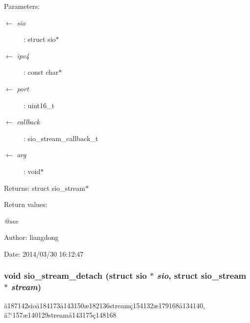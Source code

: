 \begin{Desc}
\item[Parameters:]
\begin{description}
\item[\mbox{$\leftarrow$} {\em sio}]: struct sio$\ast$ \item[\mbox{$\leftarrow$} {\em ipv4}]: const char$\ast$ \item[\mbox{$\leftarrow$} {\em port}]: uint16\_\-t \item[\mbox{$\leftarrow$} {\em callback}]: sio\_\-stream\_\-callback\_\-t \item[\mbox{$\leftarrow$} {\em arg}]: void$\ast$ \end{description}
\end{Desc}
\begin{Desc}
\item[Returns:]struct sio\_\-stream$\ast$ \end{Desc}
\begin{Desc}
\item[Return values:]
\begin{description}
\item[{\em @see}]\end{description}
\end{Desc}
\begin{Desc}
\item[Author:]liangdong \end{Desc}
\begin{Desc}
\item[Date:]2014/03/30 16:12:47 \end{Desc}
\subsubsection{\setlength{\rightskip}{0pt plus 5cm}void sio\_\-stream\_\-detach (struct sio $\ast$ {\em sio}, struct sio\_\-stream $\ast$ {\em stream})}\label{sio__stream_8c_a9}


\"{a}187142sio\"{a}184173\aa{}143150\ae{}182136stream\c{c}154132\ae{}179168\aa{}134140, \"{a}?`157\ae{}140129stream\aa{}143175\c{c}148168 

